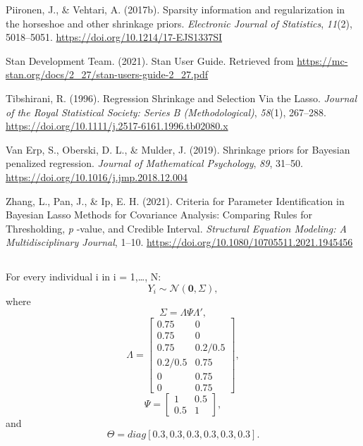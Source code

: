 \documentclass[
  man,floatsintext]{apa6}
\newlength{\cslhangindent}
\newlength{\cslentryspacingunit} %
\newenvironment{CSLReferences}[2] %
 {%
  \setlength{\parindent}{0pt}
  \ifodd #1
  \let\oldpar\par
  \def\par{\hangindent=\cslhangindent\oldpar}
  \fi
  \setlength{\parskip}{#2\cslentryspacingunit}
 }%
 {}
\begin{document}
\begin{CSLReferences}{1}{0}
\leavevmode{}%
Piironen, J., \& Vehtari, A. (2017b). Sparsity information and regularization in the horseshoe and other shrinkage priors. \emph{Electronic Journal of Statistics}, \emph{11}(2), 5018--5051. \url{https://doi.org/10.1214/17-EJS1337SI}

\leavevmode{}%
Stan Development Team. (2021). Stan {User} {Guide}. Retrieved from \url{https://mc-stan.org/docs/2_27/stan-users-guide-2_27.pdf}

\leavevmode{}%
Tibshirani, R. (1996). Regression {Shrinkage} and {Selection} {Via} the {Lasso}. \emph{Journal of the Royal Statistical Society: Series B (Methodological)}, \emph{58}(1), 267--288. \url{https://doi.org/10.1111/j.2517-6161.1996.tb02080.x}

\leavevmode{}%
Van Erp, S., Oberski, D. L., \& Mulder, J. (2019). Shrinkage priors for {Bayesian} penalized regression. \emph{Journal of Mathematical Psychology}, \emph{89}, 31--50. \url{https://doi.org/10.1016/j.jmp.2018.12.004}

\leavevmode{}%
Zhang, L., Pan, J., \& Ip, E. H. (2021). Criteria for {Parameter} {Identification} in {Bayesian} {Lasso} {Methods} for {Covariance} {Analysis}: {Comparing} {Rules} for {Thresholding}, \emph{p} -value, and {Credible} {Interval}. \emph{Structural Equation Modeling: A Multidisciplinary Journal}, 1--10. \url{https://doi.org/10.1080/10705511.2021.1945456}

\end{CSLReferences}

\endgroup


\clearpage



\begin{appendix}
\section{}
For every individual i in i = 1,\ldots, N:
\[Y_i \sim \mathcal{N}(\mathbf{0}, \Sigma),\] where
\[\Sigma = \Lambda\Psi\Lambda',\] \[\Lambda = 
    \begin{bmatrix}
    0.75 & 0 \\
    0.75 & 0 \\
    0.75 & 0.2/0.5 \\
    0.2/0.5 & 0.75 \\
    0 & 0.75 \\
    0 & 0.75
    \end{bmatrix},\] \[\Psi =
    \begin{bmatrix}
     1 & 0.5 \\
     0.5 & 1
    \end{bmatrix}
,\] and \[\Theta = diag[0.3, 0.3, 0.3, 0.3, 0.3, 0.3].\]
\end{appendix}
\end{document}
